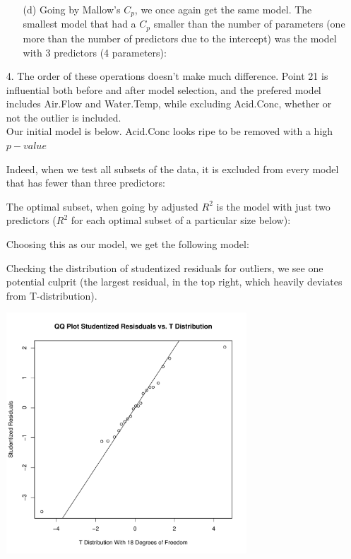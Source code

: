 \documentclass[11pt]{article}
\theoremstyle{definition}
\begin{document}
\begin{itemize}
\begin{itemize}
            \item[(d)]
                Going by Mallow's $C_p$, we once again get the same model. The smallest model that had a $C_p$ smaller than the number of parameters (one more than the number of predictors due to the intercept) was the model with 3 predictors (4 parameters): \\
                \FloatBarrier
                 
                \FloatBarrier
        \end{itemize}
    \item[4.]
        The order of these operations doesn't make much difference. Point 21 is influential both before and after model selection, and the prefered model includes Air.Flow and Water.Temp, while excluding Acid.Conc, whether or not the outlier is included. \\
        \smallskip
        Our initial model is below. Acid.Conc looks ripe to be removed with a high $p-value$
        \FloatBarrier
         
        \FloatBarrier
        Indeed, when we test all subsets of the data, it is excluded from every model that has fewer than three predictors:
        \FloatBarrier
         
        \FloatBarrier
        The optimal subset, when going by adjusted $R^2$ is the model with just two predictors ($R^2$ for each optimal subset of a particular size below):
        \FloatBarrier
         
        \FloatBarrier
        Choosing this as our model, we get the following model:
        \FloatBarrier
         
        \FloatBarrier
        Checking the distribution of studentized residuals for outliers, we see one potential culprit (the largest residual, in the top right, which heavily deviates from T-distribution).
        \begin{center}
            \includegraphics[width=9cm]{hw8/hw8_4_small_rstudent} 

\end{center}
\end{itemize}
\end{document}
